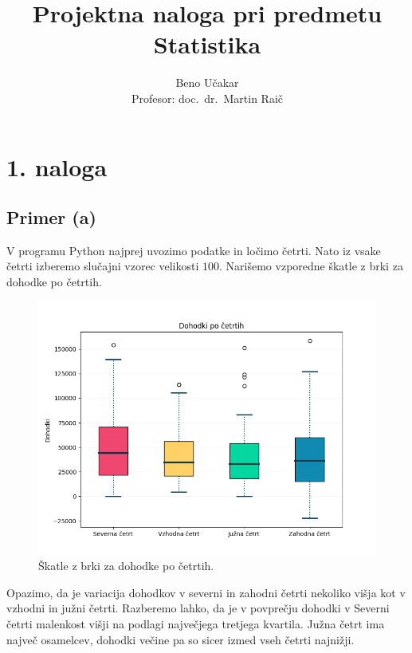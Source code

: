 \documentclass[a4paper,11pt]{article}
\begin{document}
\title{Projektna naloga pri predmetu Statistika}
\author{Beno Učakar \\ Profesor: doc.~dr.~Martin Raič}
\date{}


\maketitle


\section*{1. naloga}

\subsection*{Primer (a)}

V programu Python najprej uvozimo podatke in ločimo četrti.
Nato iz vsake četrti izberemo slučajni vzorec velikosti $100$.
Narišemo vzporedne škatle z brki za dohodke po četrtih.

\begin{figure}[H]
    \centering
    \includegraphics[scale=0.7]{Skatle_z_brki_Cetrti.png}
    \caption{Škatle z brki za dohodke po četrtih.}
\end{figure}

Opazimo, da je variacija dohodkov v severni in zahodni četrti nekoliko višja kot v vzhodni in južni četrti. 
Razberemo lahko, da je v povprečju dohodki v Severni četrti malenkost višji na podlagi največjega tretjega kvartila. 
Južna četrt ima največ osamelcev, dohodki večine pa so sicer izmed vseh četrti najnižji.
\end{document}
